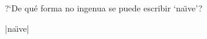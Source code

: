 

\bigskip

\enunciadoS ?`De qu\'e forma no ingenua se puede escribir
`na\"{\i}ve'?

\bigskip

\respuestaS |na\"{\i}ve|

\bye